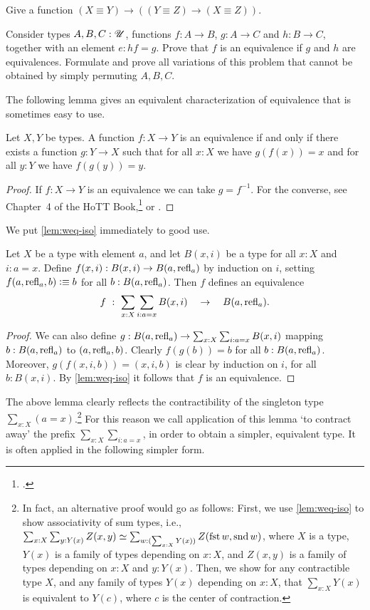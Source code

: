 \begin{xca}\label{xca:equivalence-comp}
Give  a function $(X\equiv Y) \to ((Y\equiv Z) \to (X\equiv Z))$.
\end{xca}

\begin{xca}\label{xca:2-out-of-3}
Consider types $A,B,C:{\mathscr{U}}$, functions $f:A\to B$, $g:A\to C$
and $h:B\to C$, together with an element $e: hf=g$. 
Prove that $f$ is an equivalence if $g$ and $h$ are equivalences.
Formulate and prove all variations of this problem that
cannot be obtained by simply permuting $A,B,C$.
\end{xca}

The following lemma gives an equivalent characterization
of equivalence that is sometimes easy to use.

\begin{lemma}\label{lem:weq-iso}
Let $X,Y$ be types. A function $f: X\to Y$ is an equivalence
if and only if there exists a function $g: Y\to X$ such that
for all $x:X$ we have $g(f(x))=x$ and for all 
$y:Y$ we have $f(g(y))=y$.
\end{lemma}
\begin{proof}
If $f: X\to Y$ is an equivalence we can take $g=f^{-1}$.
For the converse, see Chapter~4 of the HoTT Book,\footcite{hottbook} or .
\end{proof}

We put \cref{lem:weq-iso} immediately to good use.

\begin{lemma}\label{lem:contract-away}
Let $X$ be a type with element $a$, and let
$B(x,i)$ be a type for all $x:X$ and $i: a=x$.
Define $f(x,i): B(x,i) \to B(a,\mathrm{refl}_{a})$ by induction on $i$,
setting $f(a,\refl{a},b) \defeq b$ for all $b:B(a,\mathrm{refl}_{a})$.
Then $f$ defines an equivalence 
\[
f~:~ \sum_{x:X} \sum_{i: a=x} B(x,i) \quad \to \quad B(a,\mathrm{refl}_{a}).
\]
\end{lemma}
\begin{proof}
We can also define 
$g: B(a,\mathrm{refl}_{a})\to \sum_{x:X} \sum_{i: a=x} B(x,i)$
mapping $b: B(a,\mathrm{refl}_{a})$ to $(a,\mathrm{refl}_{a},b)$.
Clearly $f(g(b))=b$ for all $b:B(a,\mathrm{refl}_{a})$.
Moreover, $g(f(x,i,b))=(x,i,b)$ is clear by induction
on $i$, for all $b:B(x,i)$.
By \cref{lem:weq-iso} it follows that $f$
is an equivalence.
\end{proof}

The above lemma clearly reflects the  contractibility of the
singleton type $\sum_{x:X}(a=x)$.\footnote{%
  In fact, an alternative proof would go as follows:
  First, we use \cref{lem:weq-iso} to show associativity of sum types,
  i.e., $\sum_{x:X}\sum_{y:Y(x)}Z(x,y)
  \equiv \sum_{w : (\sum_{x:X}Y(x))}Z(\fst w,\snd w)$,
  where $X$ is a type,
  $Y(x)$ is a family of types depending on $x:X$,
  and $Z(x,y)$ is a family of types depending on $x:X$ and $y:Y(x)$.
  Then, we show for any contractible type $X$,
  and any family of types $Y(x)$ depending on $x:X$,
  that $\sum_{x:X}Y(x)$ is equivalent to $Y(c)$,
  where $c$ is the center of contraction.}
For this reason
we call application of this lemma `to contract away'
the prefix $\sum_{x:X} \sum_{i: a=x}$, in order
to obtain a simpler, equivalent type. It is often applied
in the following simpler form.

